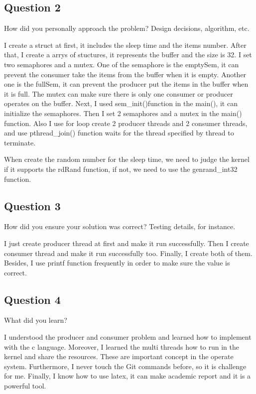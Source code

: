 \documentclass[10pt,draftclsnofoot,peerreview,letterpaper,onecolumn,]{IEEEtran}
\begin{document}
\subsection{Question 2}

How did you personally approach the problem? Design decisions, algorithm, etc.

I create a struct at first, it includes the sleep time and the items number. After that, I create a arrys of stuctures, it represents the buffer and the size is 32. I set two semaphores and a mutex. One of the semaphore is the emptySem, it can prevent the consumer take the items from the buffer when it is empty. Another one is the fullSem, it can prevent the producer put the items in the buffer when it is full. The mutex can make sure there is only one consumer or producer operates on the buffer. Next, I used sem\_init()function in the main(), it can initialize the semaphores. Then I set 2 semaphores and a mutex in the main() function. Also I use for loop create 2 producer threads and 2 consumer threads, and use pthread\_join() function waits for the thread specified by thread to terminate.

When create the random number for the sleep time, we need to judge the kernel if it supports the rdRand function, if not, we need to use the genrand\_int32 function.

\subsection{Question 3}
How did you ensure your solution was correct? Testing details, for instance.

I just create producer thread at first and make it run successfully. Then I create consumer thread  and make it run successfully too. Finally, I create both of them. Besides, I use printf function frequently in order to make sure the value is correct.

\subsection{Question 4}
What did you learn?

I understood the producer and consumer problem and learned how to implement with the c language. Moreover, I learned the multi threads how to run in the kernel and share the resources. These are important concept in the operate system. Furthermore, I never touch the Git commands before, so it is challenge for me. Finally, I know how to use latex, it can make academic report and it is a powerful tool.
\end{document}
